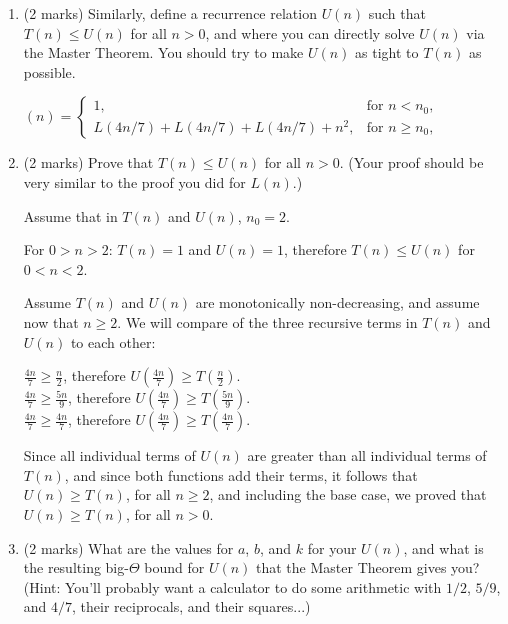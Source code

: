 \documentclass[11pt]{article}
\begin{document}
\begin{enumerate}
\item (2 marks)
Similarly, define a recurrence relation
$U(n)$ such that $T(n)\leq U(n)$ for all $n>0$, and
where you can directly solve $U(n)$ via the Master Theorem.
You should try to make $U(n)$ as tight to $T(n)$ as possible.

\begin{soln}

  $(n) = \left\{
  \begin{array}{ll}
    1, & \mbox{for $n < n_0$}, \\
    L(4n/7) + L(4n/7) + L(4n/7) + n^2, & \mbox{for $n \ge n_0$},
  \end{array} \right.$

\end{soln}


\item (2 marks)
Prove that $T(n)\leq U(n)$ for all $n>0$.  (Your proof should
be very similar to the proof you did for $L(n)$.)

\begin{soln}
Assume that in $T(n)$ and $U(n)$, $n_0 = 2$.

For $0>n>2$: $T(n) = 1$ and $U(n) = 1$, therefore $T(n) \leq U(n)$ for $0<n<2$.

Assume $T(n)$ and $U(n)$ are monotonically non-decreasing, and assume now that $n \geq 2$. We will compare  of the three recursive terms in $T(n)$ and $U(n)$ to each other:

$\frac{4n}{7} \geq \frac{n}{2}$, therefore $U(\frac{4n}{7}) \geq T(\frac{n}{2})$. \\
$\frac{4n}{7} \geq \frac{5n}{9}$, therefore $U(\frac{4n}{7}) \geq T(\frac{5n}{9})$. \\
$\frac{4n}{7} \geq \frac{4n}{7}$, therefore $U(\frac{4n}{7}) \geq T(\frac{4n}{7})$.

Since all individual terms of $U(n)$ are greater than all individual terms of $T(n)$, and since both functions add their terms, it follows that $U(n) \geq T(n)$, for all $n \geq 2$, and including the base case, we proved that $U(n) \geq T(n)$, for all $n > 0$.
\end{soln}

\item (2 marks)
What are the values for $a$, $b$, and $k$ for your $U(n)$, and
what is the resulting big-$\Theta$ bound for $U(n)$ that the
Master Theorem gives you?
(Hint:  You'll probably want a calculator to do some arithmetic with
$1/2$, $5/9$, and $4/7$, their reciprocals, and their squares...)


\end{enumerate}
\end{document}
